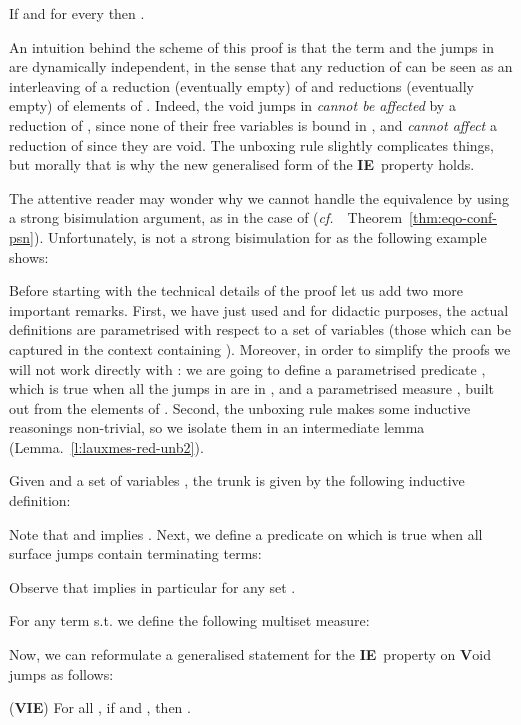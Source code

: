 \documentclass{LMCS}
\newcommand{\cf}{{\it  cf.}~}
\renewcommand{\>}{\rightarrow}
\newcommand{\iep}{{\bf IE}}
\newcommand{\viep}{{\bf VIE}}
\begin{document}
\begin{center}
If  and  for every 
 then .
\end{center}



An intuition behind the scheme of this proof is that the term
 and the jumps in  are dynamically
independent, in the sense that any reduction of  can be seen as an
interleaving of a reduction (eventually empty) of  and
reductions (eventually empty) of elements of . Indeed,
the void jumps in  \textit{cannot be affected} by a
reduction of , since none of their free variables is bound
in , and \textit{cannot affect} a reduction of  since
they are void. The unboxing rule slightly complicates things, but
morally that is why the new generalised form of the
\iep\ property holds.\medskip

The attentive reader
may wonder why we cannot handle the equivalence  by using a strong
bisimulation argument, as in the case of  (\cf\ Theorem~\ref{thm:eqo-conf-psn}). 
Unfortunately,  is not a strong bisimulation 
for  as the following example shows:
 

Before starting with the technical details of the proof let us add two
more important remarks. First, we have just used  and
 for didactic purposes, the actual definitions are
parametrised with respect to a set of variables (those which can be
captured in the context containing ).  Moreover, in order to
simplify the proofs we will not work  directly with :
we are going to define a parametrised predicate ,
which is true when all the jumps in  are in , and
a parametrised measure ,  built out from the elements
of .  Second, the unboxing rule makes some inductive
reasonings non-trivial, so we isolate them in an intermediate lemma
(Lemma.~\ref{l:lauxmes-red-unb2}).\medskip


Given  and 
a set of variables , 
the trunk  is given by the following inductive definition:
 
Note that  and  implies
. Next, we define a predicate on  which is true when all surface jumps contain terminating terms: 
 
Observe that  implies in particular
 for any set .

For any term  s.t.  we define the following multiset measure:
 
Now, we can reformulate a generalised statement for the \iep\ property on {\bf V}oid jumps as follows:

\begin{center}
(\viep)  For all  , if    and 
, then . 
\end{center}
\end{document}

